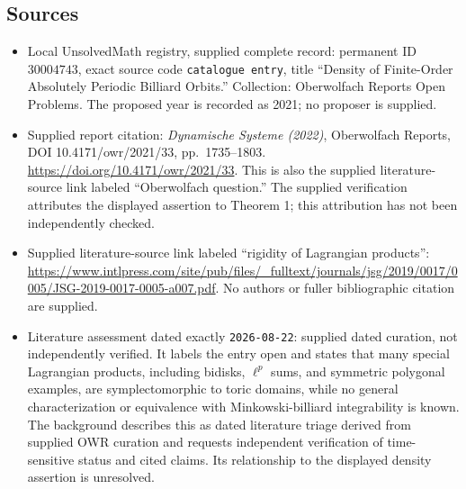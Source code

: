 \documentclass[11pt]{article}
\begin{document}
\subsection{Sources}
\begin{itemize}
\item Local UnsolvedMath registry, supplied complete record: permanent ID \(30004743\), exact source code \texttt{catalogue entry}, title ``Density of Finite-Order Absolutely Periodic Billiard Orbits.'' Collection: Oberwolfach Reports Open Problems. The proposed year is recorded as 2021; no proposer is supplied.
\item Supplied report citation: \emph{Dynamische Systeme (2022)}, Oberwolfach Reports, DOI 10.4171/owr/2021/33, pp.\ 1735--1803. \url{https://doi.org/10.4171/owr/2021/33}. This is also the supplied literature-source link labeled ``Oberwolfach question.'' The supplied verification attributes the displayed assertion to Theorem 1; this attribution has not been independently checked.
\item Supplied literature-source link labeled ``rigidity of Lagrangian products'': \url{https://www.intlpress.com/site/pub/files/_fulltext/journals/jsg/2019/0017/0005/JSG-2019-0017-0005-a007.pdf}. No authors or fuller bibliographic citation are supplied.
\item Literature assessment dated exactly \texttt{2026-08-22}: supplied dated curation, not independently verified. It labels the entry open and states that many special Lagrangian products, including bidisks, \(\ell^p\) sums, and symmetric polygonal examples, are symplectomorphic to toric domains, while no general characterization or equivalence with Minkowski-billiard integrability is known. The background describes this as dated literature triage derived from supplied OWR curation and requests independent verification of time-sensitive status and cited claims. Its relationship to the displayed density assertion is unresolved.
\end{itemize}
\end{document}
